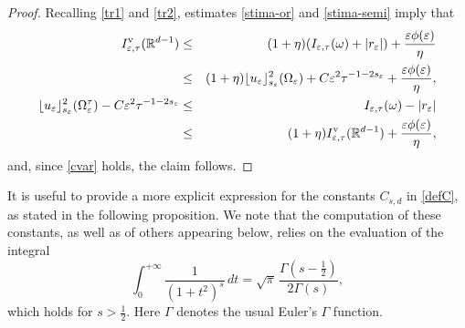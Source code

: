 \documentclass[11pt]{article}
\def\e{\varepsilon}
\begin{document}
\begin{proof}
Recalling \eqref{tr1} and \eqref{tr2}, estimates \eqref{stima-or} and \eqref{stima-semi} imply that 
\begin{eqnarray*}
I_{\e,\tau}^{\rm v}(\mathbb R^{d-1})&\leq&(1+\eta)(I_{\e,\tau}(\omega)+|r_\e|)+\frac{\e\phi(\e)}{\eta}\\
&\leq&(1+\eta)\lfloor u_\e\rfloor_{s_\e}^2(\Omega_\e)
+C\e^2\tau^{-1-2s_\e}
+\frac{\e\phi(\e)}{\eta},
\\
\lfloor u_\e\rfloor_{s_\e}^2(\Omega_\e^\tau)-C\e^2\tau^{-1-2s_\e}&\leq& I_{\e,\tau}(\omega)-|r_\e|\\
&\leq&(1+\eta)I_{\e,\tau}^{\rm v}(\mathbb R^{d-1})+\frac{\e\phi(\e)}{\eta}, 
\end{eqnarray*}
and, since \eqref{cvar} holds, the claim follows. \end{proof}

It is useful to provide a more explicit expression for the constants $C_{s,d}$ in \eqref{defC}, as stated in the following proposition. We note that the computation of these constants, as well as of others appearing below, relies on the evaluation of the integral
\[
\int_0^{+\infty}\frac{1}{(1+t^2)^s}\,dt
=
\sqrt{\pi}\,\frac{\Gamma\!\left(s-\frac12\right)}{2\Gamma(s)},
\]
which holds for $s>\frac12$. Here $\Gamma$ denotes the usual Euler's $\Gamma$ function.
\end{document}

